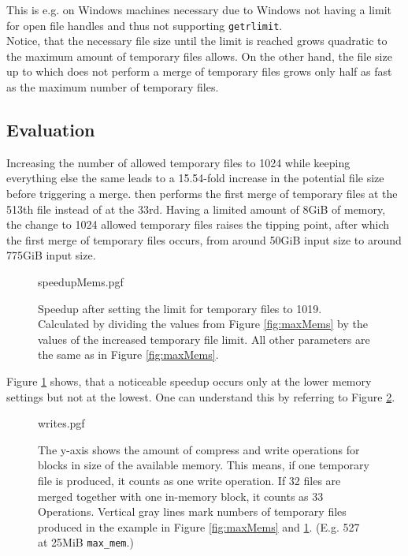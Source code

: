 This is e.g. on Windows machines necessary due to Windows not having a limit for open file handles and thus not supporting \texttt{getrlimit}. \\
Notice, that the necessary file size until the limit is reached grows quadratic to the maximum amount of temporary files \sort allows. On the other hand, the file size up to which \sort does not perform a merge of temporary files grows only half as fast as the maximum number of temporary files.

\subsection{Evaluation}
Increasing the number of allowed temporary files to 1024 while keeping everything else the same leads to a 15.54-fold increase in the potential file size before triggering a merge. \sort then performs the first merge of temporary files at the 513th file instead of at the 33rd. Having a limited amount of 8GiB of memory, the change to 1024 allowed temporary files raises the tipping point, after which the first merge of temporary files occurs, from around 50GiB input size to around 775GiB input size.\\
\begin{figure}
        {speedupMems.pgf}
    \caption{Speedup after setting the limit for temporary files to 1019. Calculated by dividing the values from Figure \ref{fig:maxMems} by the values of the increased temporary file limit. All other parameters are the same as in Figure \ref{fig:maxMems}.}
    \label{fig:memSpeedup}
\end{figure}
Figure \ref{fig:memSpeedup} shows, that a noticeable speedup occurs only at the lower memory settings but not at the lowest. One can understand this by referring to Figure \ref{fig:writes}.
\begin{figure}
        {writes.pgf}
    \caption{
    The y-axis shows the amount of compress and write operations for blocks in size of the available memory. This means, if one temporary file is produced, it counts as one write operation. If 32 files are merged together with one in-memory block, it counts as 33 Operations. Vertical gray lines mark numbers of temporary files produced in the example in Figure \ref{fig:maxMems} and \ref{fig:memSpeedup}. (E.g. 527 at 25MiB \texttt{max\_mem}.)
    }
    \label{fig:writes}
\end{figure}
